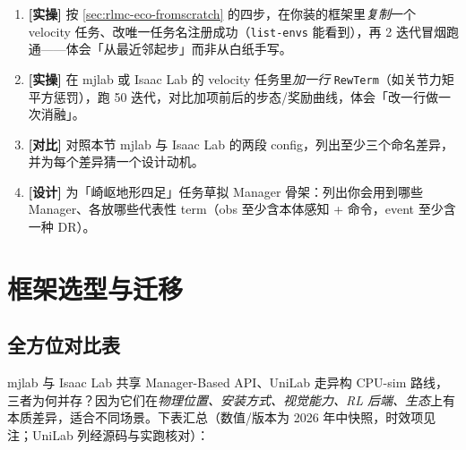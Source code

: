 \begin{practice}[练习·Manager 架构]
\begin{enumerate}
  \item \textbf{[实操]} 按 \cref{sec:rlmc-eco-fromscratch} 的四步，在你装的框架里\emph{复制}一个 velocity 任务、改唯一任务名注册成功（\verb|list-envs| 能看到），再 2 迭代冒烟跑通——体会「从最近邻起步」而非从白纸手写。
  \item \textbf{[实操]} 在 mjlab 或 Isaac Lab 的 velocity 任务里\emph{加一行} \verb|RewTerm|（如关节力矩平方惩罚），跑 50 迭代，对比加项前后的步态/奖励曲线，体会「改一行做一次消融」。
  \item \textbf{[对比]} 对照本节 mjlab 与 Isaac Lab 的两段 config，列出至少三个命名差异，并为每个差异猜一个设计动机。
  \item \textbf{[设计]} 为「崎岖地形四足」任务草拟 Manager 骨架：列出你会用到哪些 Manager、各放哪些代表性 term（obs 至少含本体感知 + 命令，event 至少含一种 DR）。
\end{enumerate}
\end{practice}

\section{框架选型与迁移}
\label{sec:rlmc-eco-select}

\subsection{全方位对比表}

mjlab 与 Isaac Lab 共享 Manager-Based API、UniLab 走异构 CPU-sim 路线，三者为何并存？因为它们在\emph{物理位置、安装方式、视觉能力、RL 后端、生态}上有本质差异，适合不同场景。下表汇总（数值/版本为 2026 年中快照，时效项见注；UniLab 列经源码与实跑核对）：

